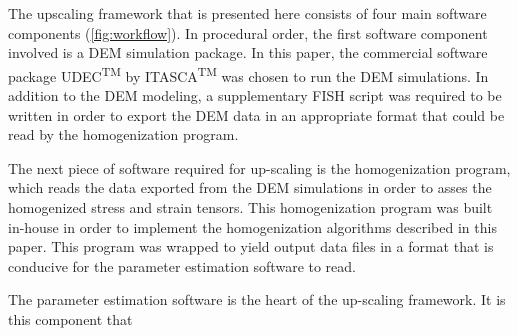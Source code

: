 The upscaling framework that is presented here consists of four main software components (\ref{fig:workflow}). In procedural order, the first software component involved is a DEM simulation package. In this paper, the commercial software package UDEC\textsuperscript{TM} by ITASCA\textsuperscript{TM} was chosen to run the DEM simulations. In addition to the DEM modeling, a supplementary FISH script was required to be written in order to export the DEM data in an appropriate format that could be read by the homogenization program. 

The next piece of software required for up-scaling is the homogenization program, which reads the data exported from the DEM simulations in order to asses the homogenized stress and strain tensors. This homogenization program was built in-house in order to implement the homogenization algorithms described in this paper. This program was wrapped to yield output data files in a format that is conducive for the parameter estimation software to read. 

The parameter estimation software is the heart of the up-scaling framework. It is this component that 
